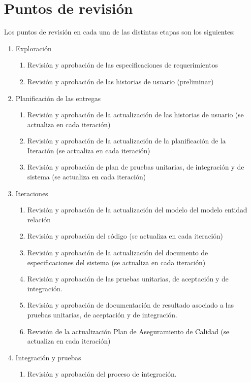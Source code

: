 \section{Puntos de revisión}
Los puntos de revisión en cada una de las distintas etapas son los siguientes:
\begin{enumerate}
	\item Exploración
	\begin{enumerate}
		\item Revisión y aprobación de las especificaciones de requerimientos
		\item Revisión y aprobación de las historias de usuario (preliminar)
	\end{enumerate}
	\item Planificación de las entregas
	\begin{enumerate}
		\item Revisión y aprobación de la actualización de las historias de usuario (se actualiza en cada iteración)
		\item Revisión y aprobación de la actualización de la planificación de la Iteración (se actualiza en cada iteración)
		\item Revisión y aprobación de plan de pruebas unitarias, de integración y de sistema (se actualiza en cada iteración)
	\end{enumerate} 
	\item Iteraciones
	\begin{enumerate}
		\item Revisión y aprobación de la actualización del modelo del modelo entidad relación
		\item Revisión y aprobación del código (se actualiza en cada iteración)
		\item Revisión y aprobación de la actualización del documento de especificaciones del sistema (se actualiza en cada iteración)
		\item Revisión y aprobación de las pruebas unitarias, de aceptación y de integración.
		\item Revisión y aprobación de documentación de resultado asociado a las pruebas unitarias, de aceptación y de integración. 
		\item Revisión de la actualización Plan de Aseguramiento de Calidad (se actualiza en cada iteración)
	\end{enumerate} 	
	\item Integración y pruebas
	\begin{enumerate} 
		\item Revisión y aprobación del proceso de integración.

\end{enumerate}
\end{enumerate}
